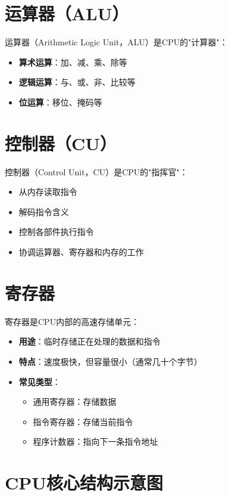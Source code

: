 \documentclass[12pt,UTF8]{ctexbook}
\begin{document}
\section{运算器（ALU）}

运算器（Arithmetic Logic Unit，ALU）是CPU的"计算器"：

\begin{itemize}[leftmargin=2em]
    \item \textbf{算术运算}：加、减、乘、除等
    \item \textbf{逻辑运算}：与、或、非、比较等
    \item \textbf{位运算}：移位、掩码等
\end{itemize}

\section{控制器（CU）}

控制器（Control Unit，CU）是CPU的"指挥官"：

\begin{itemize}[leftmargin=2em]
    \item 从内存读取指令
    \item 解码指令含义
    \item 控制各部件执行指令
    \item 协调运算器、寄存器和内存的工作
\end{itemize}

\section{寄存器}

寄存器是CPU内部的高速存储单元：

\begin{itemize}[leftmargin=2em]
    \item \textbf{用途}：临时存储正在处理的数据和指令
    \item \textbf{特点}：速度极快，但容量很小（通常几十个字节）
    \item \textbf{常见类型}：
    \begin{itemize}
        \item 通用寄存器：存储数据
        \item 指令寄存器：存储当前指令
        \item 程序计数器：指向下一条指令地址
    \end{itemize}
\end{itemize}

\section{CPU核心结构示意图}
\end{document}
